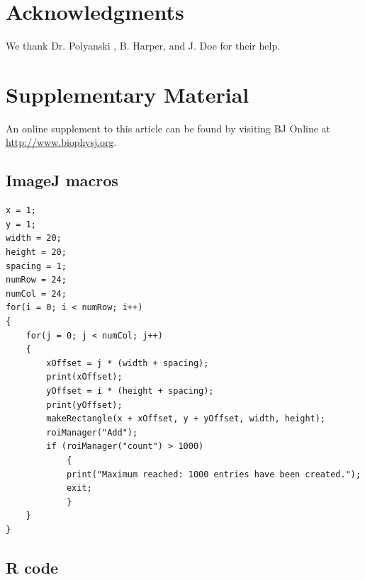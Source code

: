 \documentclass{biophys-new}
\begin{document}
\section*{Acknowledgments}
We thank Dr. Polyanski , B. Harper, and J. Doe for their help.




\section*{Supplementary Material}
An online supplement to this article can be found by visiting BJ Online at \url{http://www.biophysj.org}.

\subsection*{ImageJ macros}\label{macros}
\begin{lstlisting}
x = 1;
y = 1;
width = 20;
height = 20;
spacing = 1;
numRow = 24;
numCol = 24;
for(i = 0; i < numRow; i++)
{
	for(j = 0; j < numCol; j++)
	{
		xOffset = j * (width + spacing);
		print(xOffset);
		yOffset = i * (height + spacing);
		print(yOffset);
		makeRectangle(x + xOffset, y + yOffset, width, height);
		roiManager("Add");
		if (roiManager("count") > 1000)
			{
			print("Maximum reached: 1000 entries have been created.");
			exit;
			}
	}
}
\end{lstlisting}

\subsection*{R code}
\end{document}
